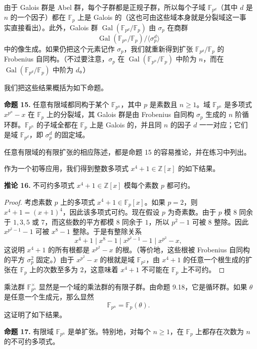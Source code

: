 由于 Galois 群是 Abel 群，每个子群都是正规子群，所以每个子域 $\mathbb F_{p^d}$（其中 $d$ 是 $n$ 的一个因子）都在 $\mathbb F_p$ 上是 Galois 的（这也可由这些域本身就是分裂域这一事实直接看出）。此外，Galois 群 $\operatorname{Gal}(\mathbb F_{p^d}/\mathbb F_p)$ 由 $\sigma_p$ 在商群
\[
\operatorname{Gal}(\mathbb F_{p^n}/\mathbb F_p)/\langle \sigma_p^d\rangle
\]
中的像生成。如果仍把这个元素记作 $\sigma_p$，我们就重新得到扩张 $\mathbb F_{p^d}/\mathbb F_p$ 的 Frobenius 自同构。（不过要注意，$\sigma_p$ 在 $\operatorname{Gal}(\mathbb F_{p^n}/\mathbb F_p)$ 中阶为 $n$，而在 $\operatorname{Gal}(\mathbb F_{p^d}/\mathbb F_p)$ 中阶为 $d$。）

我们把这些结果概括为如下命题。

\noindent\textbf{命题 15.} 任意有限域都同构于某个 $\mathbb F_{p^n}$，其中 $p$ 是素数且 $n\geq 1$。域 $\mathbb F_{p^n}$ 是多项式 $x^{p^n}-x$ 在 $\mathbb F_p$ 上的分裂域，其 Galois 群是由 Frobenius 自同构 $\sigma_p$ 生成的 $n$ 阶循环群。$\mathbb F_{p^n}$ 的子域全都在 $\mathbb F_p$ 上是 Galois 的，并且同 $n$ 的因子 $d$ 一一对应；它们是域 $\mathbb F_{p^d}$，即 $\sigma_p^d$ 的固定域。

任意有限域的有限扩张的相应陈述，都是命题 15 的容易推论，并在练习中列出。

作为一个初等应用，我们得到整数多项式 $x^4+1\in\mathbb Z[x]$ 的如下结果。

\noindent\textbf{推论 16.} 不可约多项式 $x^4+1\in\mathbb Z[x]$ 模每个素数 $p$ 都可约。

\begin{proof}
考虑素数 $p$ 上的多项式 $x^4+1\in\mathbb F_p[x]$。如果 $p=2$，则 $x^4+1=(x+1)^4$，因此该多项式可约。现在假设 $p$ 为奇素数。由于 $p$ 模 $8$ 同余于 $1,3,5$ 或 $7$，而这些数的平方都模 $8$ 同余于 $1$，所以 $p^2-1$ 可被 $8$ 整除。因此 $x^{p^2-1}-1$ 可被 $x^8-1$ 整除。于是有整除关系
\[
x^4+1\mid x^8-1\mid x^{p^2-1}-1\mid x^{p^2}-x,
\]
这说明 $x^4+1$ 的所有根都是 $x^{p^2}-x$ 的根。（等价地，这些根被 Frobenius 自同构的平方 $\sigma_p^2$ 固定。）由于 $x^{p^2}-x$ 的根就是域 $\mathbb F_{p^2}$，由 $x^4+1$ 的任意一个根生成的扩张在 $\mathbb F_p$ 上的次数至多为 $2$，这意味着 $x^4+1$ 不可能在 $\mathbb F_p$ 上不可约。
\end{proof}

乘法群 $\mathbb F_{p^n}^{\times}$ 显然是一个域的乘法群的有限子群。由命题 9.18，它是循环群。如果 $\theta$ 是任意一个生成元，那么显然
\[
\mathbb F_{p^n}=\mathbb F_p(\theta).
\]
这证明了如下结果。

\noindent\textbf{命题 17.} 有限域 $\mathbb F_{p^n}$ 是单扩张。特别地，对每个 $n\geq 1$，在 $\mathbb F_p$ 上都存在次数为 $n$ 的不可约多项式。

